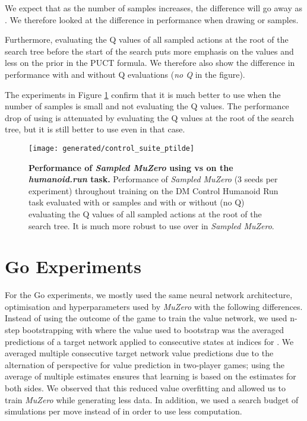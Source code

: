 \documentclass{article}
\newcommand{\muzero}{\emph{MuZero}}
\newcommand{\smuzero}{\emph{Sampled MuZero}}
\begin{document}
We expect that as the number of samples increases, the difference will go away as . We therefore looked at the difference in performance when drawing  or  samples.

Furthermore, evaluating the Q values of all sampled actions at the root of the search tree before the start of the search puts more emphasis on the values and less on the prior in the PUCT formula. We therefore also show the difference in performance with and without Q evaluations (\emph{no Q} in the figure).

The experiments in Figure \ref{fig:control-suite-ptilde} confirm that it is much better to use  when the number of samples is small and not  evaluating the Q values. The performance drop of using  is attenuated by evaluating the Q values at the root of the search tree, but it is still better to use  even in that case.


\begin{figure}
\texttt{[image: generated/control\_suite\_ptilde]}
\vspace*{-7mm}
\caption[]{
\label{fig:control-suite-ptilde}
\textbf{Performance of \smuzero{} using  vs  on the \emph{humanoid.run} task.} Performance of \smuzero{} (3 seeds per experiment) throughout training on the DM Control Humanoid Run task evaluated with  or  samples and with or without (no Q) evaluating the Q values of all sampled actions at the root of the search tree. It is much more robust to use  over  in \smuzero{}.
}
\end{figure}


\section{Go Experiments}
For the Go experiments, we mostly used the same neural network architecture, optimisation and hyperparameters used by \muzero{} \cite{muzero} with the following differences. Instead of using the outcome of the game to train the value network, we used n-step bootstrapping with  where the value used to bootstrap was the averaged predictions of a target network applied to  consecutive states at indices  for . We averaged multiple consecutive target network value predictions due to the alternation of perspective for value prediction in two-player games; using the average of multiple estimates ensures that learning is based on the estimates for both sides. We observed that this reduced value overfitting and allowed us to train \muzero{} while generating less data. In addition, we used a search budget of  simulations per move instead of  in order to use less computation.
\end{document}
